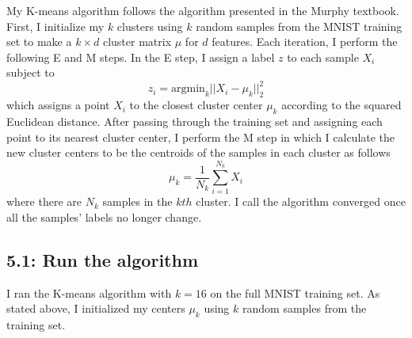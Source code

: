 \documentclass[12pt]{amsart}
\begin{document}
My K-means algorithm follows the algorithm presented in the Murphy textbook.  First, I initialize my $k$ clusters using $k$ random samples from the MNIST training set to make a $k \times d$ cluster matrix $\mu$ for $d$ features.  Each iteration, I perform the following E and M steps.  In the E step, I assign a label $z$ to each sample $X_i$ subject to
\begin{equation} \label{eqn:E_step}
z_i = \text{argmin}_k ||X_i - \mu_k ||_2^2
\end{equation}
which assigns a point $X_i$ to the closest cluster center $\mu_k$ according to the squared Euclidean distance.  After passing through the training set and assigning each point to its nearest cluster center, I perform the M step in which I calculate the new cluster centers to be the centroids of the samples in each cluster as follows
\begin{equation} \label{eqn:M_step}
\mu_k = \frac{1}{N_k} \sum_{i = 1}^{N_k} X_i
\end{equation}
where there are $N_k$ samples in the $kth$ cluster.  I call the algorithm converged once all the samples' labels no longer change.

\subsection*{5.1: Run the algorithm}
I ran the K-means algorithm with $k = 16$ on the full MNIST training set.  As stated above, I initialized my centers $\mu_k$ using $k$ random samples from the training set.
\end{document}
